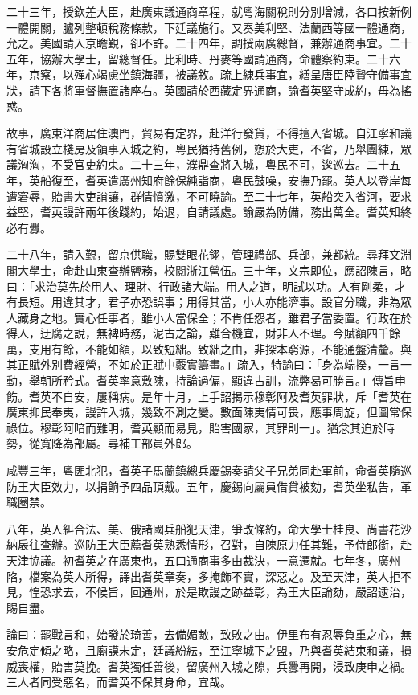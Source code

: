 \begin{pinyinscope}
二十三年，授欽差大臣，赴廣東議通商章程，就粵海關稅則分別增減，各口按新例一體開關，臚列整頓稅務條款，下廷議施行。又奏美利堅、法蘭西等國一體通商，允之。美國請入京瞻覲，卻不許。二十四年，調授兩廣總督，兼辦通商事宜。二十五年，協辦大學士，留總督任。比利時、丹麥等國請通商，命體察約束。二十六年，京察，以殫心竭慮坐鎮海疆，被議敘。疏上練兵事宜，繕呈唐臣陸贄守備事宜狀，請下各將軍督撫置諸座右。英國請於西藏定界通商，諭耆英堅守成約，毋為搖惑。

故事，廣東洋商居住澳門，貿易有定界，赴洋行發貨，不得擅入省城。自江寧和議有省城設立棧房及領事入城之約，粵民猶持舊例，愬於大吏，不省，乃舉團練，眾議洶洶，不受官吏約束。二十三年，濮鼎查將入城，粵民不可，逡巡去。二十五年，英船復至，耆英遣廣州知府餘保純詣商，粵民鼓噪，安撫乃罷。英人以登岸每遭窘辱，貽書大吏誚讓，群情憤激，不可曉諭。至二十七年，英船突入省河，要求益堅，耆英謾許兩年後踐約，始退，自請議處。諭嚴為防備，務出萬全。耆英知終必有釁。

二十八年，請入覲，留京供職，賜雙眼花翎，管理禮部、兵部，兼都統。尋拜文淵閣大學士，命赴山東查辦鹽務，校閱浙江營伍。三十年，文宗即位，應詔陳言，略曰：「求治莫先於用人、理財、行政諸大端。用人之道，明試以功。人有剛柔，才有長短。用違其才，君子亦恐誤事；用得其當，小人亦能濟事。設官分職，非為眾人藏身之地。實心任事者，雖小人當保全；不肯任怨者，雖君子當委置。行政在於得人，迂腐之說，無裨時務，泥古之論，難合機宜，財非人不理。今賦額四千餘萬，支用有餘，不能如額，以致短絀。致絀之由，非探本窮源，不能通盤清釐。與其正賦外別費經營，不如於正賦中覈實籌畫。」疏入，特諭曰：「身為端揆，一言一動，舉朝所矜式。耆英率意敷陳，持論過偏，顯違古訓，流弊曷可勝言。」傳旨申飭。耆英不自安，屢稱病。是年十月，上手詔揭示穆彰阿及耆英罪狀，斥「耆英在廣東抑民奉夷，謾許入城，幾致不測之變。數面陳夷情可畏，應事周旋，但圖常保祿位。穆彰阿暗而難明，耆英顯而易見，貽害國家，其罪則一」。猶念其迫於時勢，從寬降為部屬。尋補工部員外郎。

咸豐三年，粵匪北犯，耆英子馬蘭鎮總兵慶錫奏請父子兄弟同赴軍前，命耆英隨巡防王大臣效力，以捐餉予四品頂戴。五年，慶錫向屬員借貸被劾，耆英坐私告，革職圈禁。

八年，英人糾合法、美、俄諸國兵船犯天津，爭改條約，命大學士桂良、尚書花沙納扆往查辦。巡防王大臣薦耆英熟悉情形，召對，自陳原力任其難，予侍郎銜，赴天津協議。初耆英之在廣東也，五口通商事多由裁決，一意遷就。七年冬，廣州陷，檔案為英人所得，譯出耆英章奏，多掩飾不實，深惡之。及至天津，英人拒不見，惶恐求去，不候旨，回通州，於是欺謾之跡益彰，為王大臣論劾，嚴詔逮治，賜自盡。

論曰：罷戰言和，始發於琦善，去備媚敵，致敗之由。伊里布有忍辱負重之心，無安危定傾之略，且廟謨未定，廷議紛紜，至江寧城下之盟，乃與耆英結束和議，損威喪權，貽害莫挽。耆英獨任善後，留廣州入城之隙，兵釁再開，浸致庚申之禍。三人者同受惡名，而耆英不保其身命，宜哉。


\end{pinyinscope}